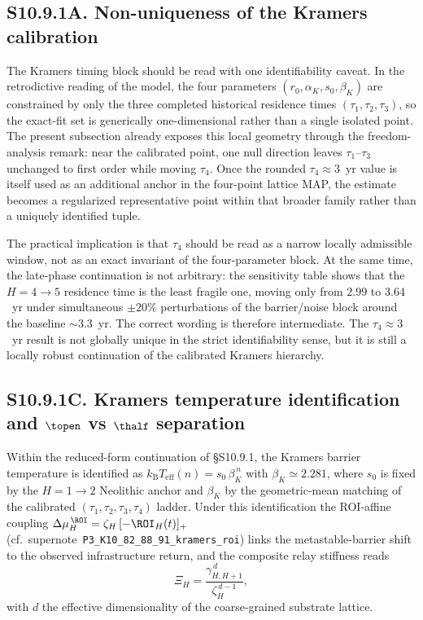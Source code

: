 \documentclass[11pt]{article}
\begin{document}
\subsection*{S10.9.1A. Non-uniqueness of the Kramers calibration}
\label{sec:S10_9_1A_nonuniqueness}

The Kramers timing block should be read with one identifiability caveat.
In the retrodictive reading of the model, the four parameters
$(r_0,\alpha_K,s_0,\beta_K)$ are constrained by only the three completed
historical residence times $(\tau_1,\tau_2,\tau_3)$, so the exact-fit set is
generically one-dimensional rather than a single isolated point.
The present subsection already exposes this local geometry through the
freedom-analysis remark: near the calibrated point, one null direction leaves
$\tau_1$--$\tau_3$ unchanged to first order while moving $\tau_4$.
Once the rounded $\tau_4\approx 3$~yr value is itself used as an additional
anchor in the four-point lattice MAP, the estimate becomes a regularized
representative point within that broader family rather than a uniquely
identified tuple.

The practical implication is that $\tau_4$ should be read as a narrow locally
admissible window, not as an exact invariant of the four-parameter block.
At the same time, the late-phase continuation is not arbitrary:
the sensitivity table shows that the $H{=}4\to 5$ residence time is the
least fragile one, moving only from $2.99$ to $3.64$~yr under simultaneous
$\pm 20\%$ perturbations of the barrier/noise block around the baseline
${\sim}3.3$~yr.
The correct wording is therefore intermediate.
The $\tau_4\approx 3$~yr result is not globally unique in the strict
identifiability sense, but it is still a locally robust continuation of the
calibrated Kramers hierarchy.

\subsection*{S10.9.1C. Kramers temperature identification and \texorpdfstring{$\topen$}{t\_open} vs \texorpdfstring{$\thalf$}{t\_half} separation}
\label{subsec:S10_9_1C_kramers_roi}

Within the reduced-form continuation of \S S10.9.1, the Kramers barrier temperature is identified as $k_{\mathrm B}T_{\mathrm{eff}}(n)=s_0\,\beta_K^{\,n}$ with $\beta_K\simeq 2.281$, where $s_0$ is fixed by the $H{=}1\!\to\!2$ Neolithic anchor and $\beta_K$ by the geometric-mean matching of the calibrated $(\tau_1,\tau_2,\tau_3,\tau_4)$ ladder.  Under this identification the ROI-affine coupling $\Delta\mu_H^{\,\ROI}=\zeta_H\,[-\ROI_H(t)]_+$ (cf.\ supernote~\texttt{P3\_K10\_82\_88\_91\_kramers\_roi}) links the metastable-barrier shift to the observed infrastructure return, and the composite relay stiffness reads
\[
\Xi_H=\frac{\gamma^{\,d}_{H,H+1}}{\zeta_H^{\,d-1}},
\]
with $d$ the effective dimensionality of the coarse-grained substrate lattice.
\end{document}
